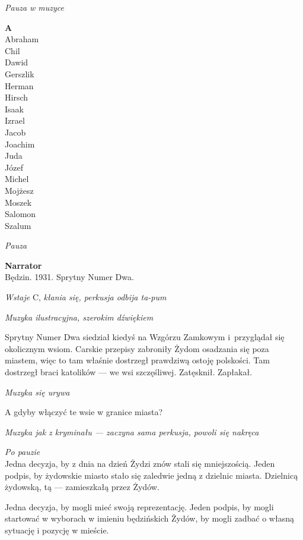 \documentclass[11pt,a4paper,oneside]{article}
\begin{document}
{\color{light-gray} \emph{Pauza w muzyce}}

\textbf{A}\\
Abraham\\
Chil\\
Dawid\\
Gerszlik\\
Herman\\
Hirsch\\
Isaak\\
Izrael\\
Jacob\\
Joachim\\
Juda\\
Józef\\
Michel\\
Mojżesz\\
Moszek\\
Salomon\\
Szalum

{\color{light-gray} \emph{Pauza}}

\textbf{Narrator}\\
Będzin. 1931. Sprytny Numer Dwa. 

{\color{light-gray} \emph{Wstaje} C, \emph{kłania się, perkusja odbija
ta-pum}}

{\color{light-gray} \emph{Muzyka ilustracyjna, szerokim dźwiękiem}}

Sprytny Numer Dwa siedział kiedyś na Wzgórzu Zamkowym i~przyglądał się
okolicznym wsiom. Carskie przepisy zabroniły Żydom osadzania się poza
miastem, więc to tam właśnie dostrzegł prawdziwą ostoję polskości. Tam
dostrzegł braci katolików --- we wsi szczęśliwej. Zatęsknił. Zapłakał.

{\color{light-gray} \emph{Muzyka się urywa}}

A gdyby włączyć te wsie w granice miasta?

{\color{light-gray} \emph{Muzyka jak z kryminału --- zaczyna sama
perkusja, powoli się nakręca}}

{\color{light-gray} \emph{Po pauzie}}\\
Jedna decyzja, by z dnia na dzień Żydzi znów stali się mniejszością.
Jeden podpis, by żydowskie miasto stało się zaledwie jedną z dzielnic
miasta.  Dzielnicą żydowską, tą --- zamieszkałą przez Żydów. 

Jedna decyzja, by mogli mieć swoją reprezentację. Jeden podpis, by
mogli startować w wyborach w imieniu będzińskich Żydów, by mogli
zadbać o własną sytuację i pozycję w mieście. 
\end{document}
